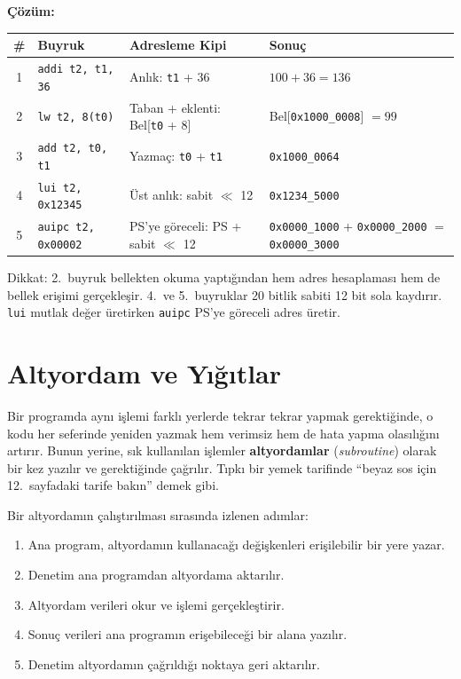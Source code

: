 \begin{ornek}[3.18]
\textbf{Çözüm:}

\begin{center}
\small
\begin{tabular}{clp{3.8cm}l}
\toprule
\textbf{\#} & \textbf{Buyruk} & \textbf{Adresleme Kipi} & \textbf{Sonuç} \\
\midrule
1 & \texttt{addi t2, t1, 36} & Anlık: \texttt{t1} + 36 & $100 + 36 = 136$ \\
2 & \texttt{lw t2, 8(t0)} & Taban + eklenti: Bel[\texttt{t0} + 8] & Bel[\texttt{0x1000\_0008}] $= 99$ \\
3 & \texttt{add t2, t0, t1} & Yazmaç: \texttt{t0} + \texttt{t1} & \texttt{0x1000\_0064} \\
4 & \texttt{lui t2, 0x12345} & Üst anlık: sabit $\ll$ 12 & \texttt{0x1234\_5000} \\
5 & \texttt{auipc t2, 0x00002} & PS'ye göreceli: PS + sabit $\ll$ 12 & \texttt{0x0000\_1000} + \texttt{0x0000\_2000} $=$ \texttt{0x0000\_3000} \\
\bottomrule
\end{tabular}
\end{center}

Dikkat: 2.~buyruk bellekten okuma yaptığından hem adres hesaplaması hem de bellek erişimi gerçekleşir. 4.~ve 5.~buyruklar 20 bitlik sabiti 12 bit sola kaydırır. \texttt{lui} mutlak değer üretirken \texttt{auipc} PS'ye göreceli adres üretir.
\end{ornek}

\section{Altyordam ve Yığıtlar}
\label{sec:altyordam-yigitlar}

Bir programda aynı işlemi farklı yerlerde tekrar tekrar yapmak gerektiğinde, o kodu her seferinde yeniden yazmak hem verimsiz hem de hata yapma olasılığını artırır. Bunun yerine, sık kullanılan işlemler \textbf{altyordamlar} (\emph{subroutine}) olarak bir kez yazılır ve gerektiğinde çağrılır. Tıpkı bir yemek tarifinde ``beyaz sos için 12.~sayfadaki tarife bakın'' demek gibi.

Bir altyordamın çalıştırılması sırasında izlenen adımlar:
\begin{enumerate}
\item Ana program, altyordamın kullanacağı değişkenleri erişilebilir bir yere yazar.
\item Denetim ana programdan altyordama aktarılır.
\item Altyordam verileri okur ve işlemi gerçekleştirir.
\item Sonuç verileri ana programın erişebileceği bir alana yazılır.
\item Denetim altyordamın çağrıldığı noktaya geri aktarılır.
\end{enumerate}


